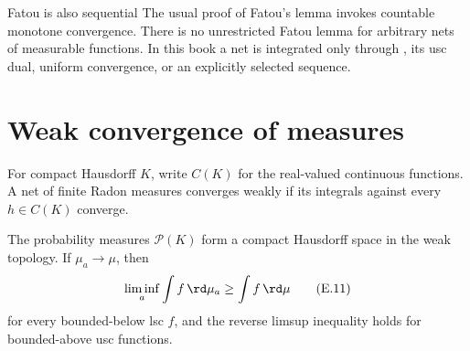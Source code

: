\begin{warning}{Fatou is also sequential}
\label{warn:appE-fatou-nets}
The usual proof of Fatou's lemma invokes countable monotone convergence.
There is no unrestricted Fatou lemma for arbitrary nets of measurable
functions.
In this book a net is integrated only through
, its usc dual, uniform convergence,
or an explicitly selected sequence.
\end{warning}

\section{Weak convergence of measures}
\label{sec:appE-weak-measures}

For compact Hausdorff \(K\), write \(C(K)\) for the real-valued continuous
functions.  A net of finite Radon measures converges weakly if its integrals
against every \(h\in C(K)\) converge.

\begin{proposition}\label{prop:appE-measure-compactness}
The probability measures \(\mathcal P(K)\) form a compact Hausdorff space in
the weak topology.
If \(\mu_a\to\mu\), then
\[
 \liminf_a\int f\,\rd \mu_a\geq\int f\,\rd \mu
\tag{E.11}\label{eq:appE-portmanteau-lsc}
\]
for every bounded-below lsc \(f\), and the reverse limsup inequality holds
for bounded-above usc functions.
\end{proposition}

